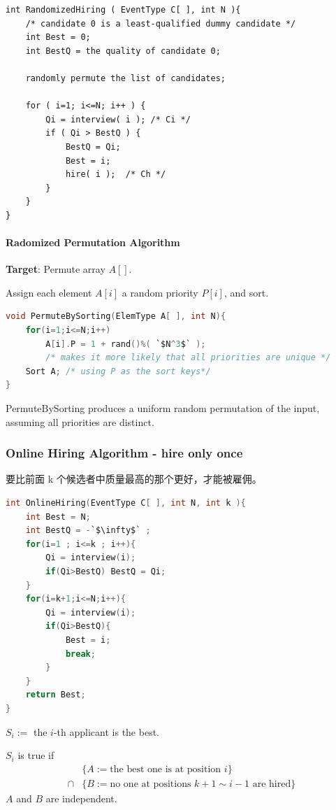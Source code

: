 \documentclass{article}
\begin{document}
\begin{lstlisting}
int RandomizedHiring ( EventType C[ ], int N ){
    /* candidate 0 is a least-qualified dummy candidate */
    int Best = 0;
    int BestQ = the quality of candidate 0;

    randomly permute the list of candidates;

    for ( i=1; i<=N; i++ ) {
        Qi = interview( i ); /* Ci */
        if ( Qi > BestQ ) {
            BestQ = Qi;
            Best = i;
            hire( i );  /* Ch */
        }
    }
}
\end{lstlisting}

\paragraph{Radomized Permutation Algorithm}\quad 

\textbf{Target}: Permute array $A[]$. 

Assign each element $A[ i ]$ a random priority $P[ i ]$, and sort. 
\begin{lstlisting}[language={c},mathescape = true]
void PermuteBySorting(ElemType A[ ], int N){
    for(i=1;i<=N;i++)
        A[i].P = 1 + rand()%( `$N^3$` ); 
        /* makes it more likely that all priorities are unique */
    Sort A; /* using P as the sort keys*/
}
\end{lstlisting}

PermuteBySorting produces a uniform random permutation of the input, assuming all priorities are distinct.

\subsubsection{Online Hiring Algorithm - hire only once}

要比前面 k 个候选者中质量最高的那个更好，才能被雇佣。

\begin{lstlisting}[language={c}]
int OnlineHiring(EventType C[ ], int N, int k ){
    int Best = N;
    int BestQ = -`$\infty$` ;
    for(i=1 ; i<=k ; i++){
        Qi = interview(i);
        if(Qi>BestQ) BestQ = Qi;
    }
    for(i=k+1;i<=N;i++){
        Qi = interview(i);
        if(Qi>BestQ){
            Best = i;
            break;
        }
    }
    return Best;
}
\end{lstlisting}

$S_i:=$ the $i$-th applicant is the best. 

$S_i$ is true if
\begin{align*}
    &\{ A:= \text{the best one is at position $i$} \} \\
    \cap &\{ B:=  \text{no one at positions $k+1 \sim i-1$ are hired} \}    
\end{align*}
$A$ and $B$ are independent. 
\end{document}
